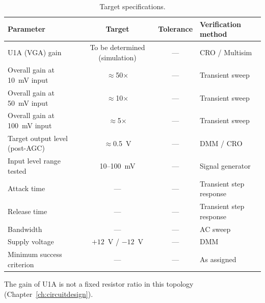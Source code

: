 \begin{table}[!htbp]
\centering
\caption{Target specifications.}
\label{tab:target-specs}
\begin{tabularx}{\textwidth}{@{}Xccl@{}}
\toprule
\textbf{Parameter} & \textbf{Target} & \textbf{Tolerance} & \textbf{Verification method} \\
\midrule
U1A (VGA) gain & To be determined (simulation) & --- & CRO / Multisim \\
Overall gain at 10~mV input & $\approx$50$\times$ & --- & Transient sweep \\
Overall gain at 50~mV input & $\approx$10$\times$ & --- & Transient sweep \\
Overall gain at 100~mV input & $\approx$5$\times$ & --- & Transient sweep \\
Target output level (post-AGC) & $\approx$0.5~V & --- & DMM / CRO \\
Input level range tested & 10--100~mV & --- & Signal generator \\
Attack time & --- & --- & Transient step response \\
Release time & --- & --- & Transient step response \\
Bandwidth & --- & --- & AC sweep \\
Supply voltage & $+12$~V / $-12$~V & --- & DMM \\
Minimum success criterion & --- & --- & As assigned \\
\bottomrule
\end{tabularx}
\par\vspace{6pt}
\begin{minipage}{0.96\textwidth}
\raggedright\small The gain of U1A is not a fixed resistor ratio in this topology (Chapter~\ref{ch:circuitdesign}).
\end{minipage}
\end{table}

\noindent{}
